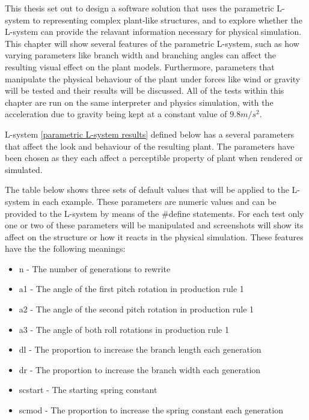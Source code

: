 This thesis set out to design a software solution that uses the parametric L-system to representing complex plant-like structures, and to explore whether the L-system can provide the relavant information necessary for physical simulation. This chapter will show several features of the parametric L-system, such as how varying parameters like branch width and branching angles can affect the resulting visual effect on the plant models. Furthermore, parameters that manipulate the physical behaviour of the plant under forces like wind or gravity will be tested and their results will be discussed. All of the tests within this chapter are run on the same interpreter and physics simulation, with the acceleration due to gravity being kept at a constant value of $9.8m/s^2$. 

L-system \ref{parametric L-system results} defined below has a several parameters that affect the look and behaviour of the resulting plant. The parameters have been chosen as they each affect a perceptible property of plant when rendered or simulated.

The table below shows three sets of default values that will be applied to the L-system in each example. These parameters are numeric values and can be provided to the L-system by means of the \#define statements. For each test only one or two of these parameters will be manipulated and screenshots will show its affect on the structure or how it reacts in the physical simulation. These features have the the following meanings: 

\begin{itemize}[noitemsep]
	\item n - The number of generations to rewrite
	\item a1 - The angle of the first pitch rotation in production rule 1
	\item a2 - The angle of the second pitch rotation in production rule 1
	\item a3 - The angle of both roll rotations in production rule 1
	\item dl - The proportion to increase the branch length each generation
	\item dr - The proportion to increase the branch width each generation
	\item scstart - The starting spring constant 
	\item scmod - The proportion to increase the spring constant each generation
\end{itemize}

